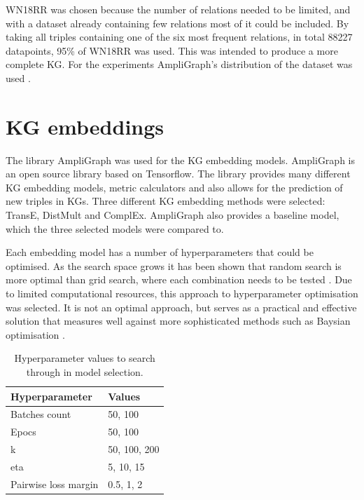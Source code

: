 WN18RR was chosen because the number of relations needed to be limited, and with a dataset already containing few relations most of it could be included. By taking all triples containing one of the six most frequent relations, in total 88227 datapoints, 95\% of WN18RR was used. This was intended to produce a more complete KG. For the experiments AmpliGraph's distribution of the dataset was used \cite{ampligraph}.

\section{KG embeddings}
The library AmpliGraph was used for the KG embedding models. AmpliGraph is an open source library based on Tensorflow. The library provides many different KG embedding models, metric calculators and also allows for the prediction of new triples in KGs. Three different KG embedding methods were selected: TransE, DistMult and ComplEx. AmpliGraph also provides a baseline model, which the three selected models were compared to. 

Each embedding model has a number of hyperparameters that could be optimised. As the search space grows it has been shown that random search is more optimal than grid search, where each combination needs to be tested \cite{bergstra2012random}. Due to limited computational resources, this approach to hyperparameter optimisation was selected. It is not an optimal approach, but serves as a practical and effective solution that measures well against more sophisticated methods such as Baysian optimisation \cite{li2017hyperband}.

\begin{table}[]
\centering
\begin{tabular}{|l|l|}
\hline
\textbf{Hyperparameter}      & \textbf{Values}             \\ \hline
Batches count       & 50, 100                              \\ \hline
Epocs               & 50, 100                          \\ \hline
k                   & 50, 100, 200                     \\ \hline
eta                 & 5, 10, 15                            \\ \hline
Pairwise loss margin    & 0.5, 1, 2                    \\ \hline
\end{tabular}
\caption{Hyperparameter values to search through in model selection.}
\end{table}

